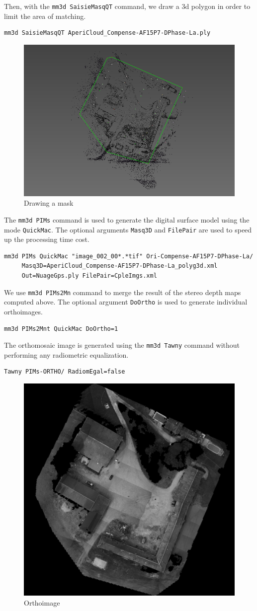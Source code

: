 Then, with the {\tt mm3d SaisieMasqQT} command, we draw a 3d polygon in order to limit the area of matching.
\begin{verbatim}
mm3d SaisieMasqQT AperiCloud_Compense-AF15P7-DPhase-La.ply
\end{verbatim}

\begin{figure}[H]
    \begin{center}
    \setlength{\unitlength}{0.5cm}
    \includegraphics[width=0.4\linewidth]{FIGS/Viabon/masq3d.png}
    \end{center}
    \caption{Drawing a mask}
    \label{fig:sel}
\end{figure}

The {\tt mm3d PIMs} command is used to generate the digital surface model using the mode {\tt QuickMac}. The optional arguments {\tt Masq3D} and {\tt FilePair} are used to speed up the processing time cost.
\begin{verbatim}
mm3d PIMs QuickMac "image_002_00*.*tif" Ori-Compense-AF15P7-DPhase-La/ 
     Masq3D=AperiCloud_Compense-AF15P7-DPhase-La_polyg3d.xml 
     Out=NuageGps.ply FilePair=CpleImgs.xml
\end{verbatim}

We use {\tt mm3d PIMs2Mn} command to merge the result of the stereo depth maps computed above. The optional argument {\tt DoOrtho} is used to generate individual orthoimages.
\begin{verbatim}
mm3d PIMs2Mnt QuickMac DoOrtho=1
\end{verbatim}

The orthomosaic image is generated using the {\tt mm3d Tawny} command without performing any radiometric equalization.
\begin{verbatim}
Tawny PIMs-ORTHO/ RadiomEgal=false
\end{verbatim}

\begin{figure}[H]
    \begin{center}
    \setlength{\unitlength}{0.5cm}
    \includegraphics[width=0.4\linewidth]{FIGS/Viabon/ortho.png}
    \end{center}
    \caption{Orthoimage}
    \label{fig:sel}
\end{figure}


